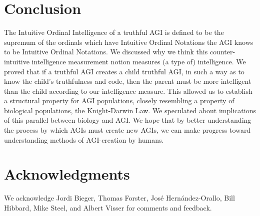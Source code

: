 \documentclass[runningheads]{llncs}
\begin{document}
\section{Conclusion}
\label{conclusionsection}

The Intuitive Ordinal Intelligence of a truthful AGI is defined to be the supremum of the
ordinals which have Intuitive Ordinal Notations the AGI knows to be Intuitive Ordinal
Notations. We discussed why we think this counter-intuitive intelligence
measurement notion measures (a type of) intelligence.
We proved that if a truthful AGI creates
a child truthful AGI, in such a way as to know the child's truthfulness and code,
then the parent must be more intelligent than the child according
to our intelligence measure. This allowed us to establish a structural
property for AGI populations,
closely resembling a property of biological populations, the Knight-Darwin
Law. We speculated about implications of this parallel between biology and
AGI.
We hope that by better understanding
the process by which AGIs must create new AGIs, we can make progress toward
understanding methods of AGI-creation by humans.

\section*{Acknowledgments}

We acknowledge Jordi Bieger, Thomas Forster, Jos{\'e} Hern{\'a}ndez-Orallo,
Bill Hibbard, Mike Steel,
and Albert Visser for comments and feedback.



\end{document}
